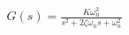 \documentclass[preview]{standalone}
\begin{document}
\begin{align*}
G(s) = \frac{K \omega_n^2}{s^2 + 2\zeta\omega_n s + \omega_n^2}
\end{align*}
\end{document}
